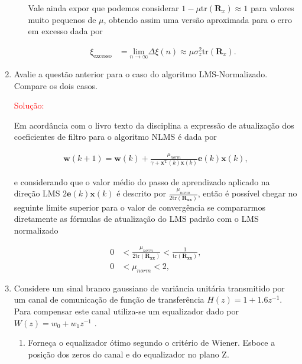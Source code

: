 \documentclass[a4paper,10pt]{article}
\begin{document}
\begin{enumerate}
\begin{enumerate}
						Vale ainda expor que podemos considerar $1 - \mu \text{tr}(\mathbf{R}_{x}) \approx 1$ para valores muito pequenos de $\mu$, obtendo assim uma versão aproximada para o erro em excesso dada por
						
						\begin{align}
							\xi_{\text{excesso}} &= \underset{n \rightarrow \infty}{\text{lim}} \Delta \xi(n) \approx \mu \sigma^{2}_{z} \text{tr}(\mathbf{R}_{x}).
						\end{align}

				\end{enumerate}

			\item Avalie a questão anterior para o caso do algoritmo LMS-Normalizado. Compare os dois casos.
				
			\textcolor{red}{Solução:}

			Em acordância com o livro texto da disciplina a expressão de atualização dos coeficientes de filtro para o algoritmo NLMS é dada por

			\begin{align}
				\mathbf{w}(k+1) = \mathbf{w}(k) + \frac{\mu_{norm}}{\gamma + \mathbf{x}^{\text{T}}(k) \mathbf{x}(k)} \mathbf{e}(k) \mathbf{x}(k),
			\end{align}

			e considerando que o valor médio do passo de aprendizado aplicado na direção LMS $2 \mathbf{e}(k) \mathbf{x}(k)$ é descrito por $\frac{\mu_{norm}}{2 \text{tr}(\mathbf{R_{xx}})}$, então é possível chegar
			no seguinte limite superior para o valor de convergência se compararmos diretamente as fórmulas de atualização do LMS padrão com o LMS normalizado

			\begin{align}
				0 &< \frac{\mu_{norm}}{2 \text{tr}(\mathbf{R_{xx}})} < \frac{1}{\text{tr}(\mathbf{R_{xx}})}, \\
				0 &< \mu_{norm} < 2, 
			\end{align}
						
			\item Considere um sinal branco gaussiano de variância unitária transmitido por um canal de comunicação de função de transferência $H(z) = 1 + 1.6z^{-1}$. Para compensar este
			canal utiliza-se um equalizador dado por $W(z) = w_{0} + w_{1}z^{-1}$ .
			
			
				\begin{enumerate}
					
					\item Forneça o equalizador ótimo segundo o critério de Wiener. Esboce a posição dos zeros do canal e do equalizador no plano Z.
					

\end{enumerate}
\end{enumerate}
\end{document}
